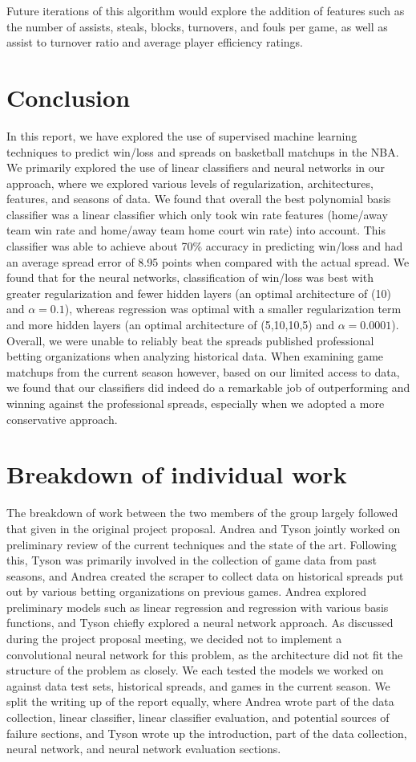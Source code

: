 \documentclass{article}
\begin{document}
Future iterations of this algorithm would explore the addition of features such as the number of assists, steals, blocks, turnovers, and fouls per game, as well as assist to turnover ratio and average player efficiency ratings.

\section{Conclusion}
In this report, we have explored the use of supervised machine learning techniques to predict win/loss and spreads on basketball matchups in the NBA. We primarily explored the use of linear classifiers and neural networks in our approach, where we explored various levels of regularization, architectures, features, and seasons of data. We found that overall the best polynomial basis classifier was a linear classifier which only took win rate features (home/away team win rate and home/away team home court win rate) into account. This classifier was able to achieve about 70\% accuracy in predicting win/loss and had an average spread error of 8.95 points when compared with the actual spread. We found that for the neural networks, classification of win/loss was best with greater regularization and fewer hidden layers (an optimal architecture of (10) and $\alpha = 0.1$), whereas regression was optimal with a smaller regularization term and more hidden layers (an optimal architecture of (5,10,10,5) and $\alpha = 0.0001$). Overall, we were unable to reliably beat the spreads published professional betting organizations when analyzing historical data. When examining game matchups from the current season however, based on our limited access to data, we found that our classifiers did indeed do a remarkable job of outperforming and winning against the professional spreads, especially when we adopted a more conservative approach.

\section{Breakdown of individual work}
The breakdown of work between the two members of the group largely followed that given in the original project proposal. Andrea and Tyson jointly worked on preliminary review of the current techniques and the state of the art. Following this, Tyson was primarily involved in the collection of game data from past seasons, and Andrea created the scraper to collect data on historical spreads put out by various betting organizations on previous games. Andrea explored preliminary models such as linear regression and regression with various basis functions, and Tyson chiefly explored a neural network approach. As discussed during the project proposal meeting, we decided not to implement a convolutional neural network for this problem, as the architecture did not fit the structure of the problem as closely. We each tested the models we worked on against data test sets, historical spreads, and games in the current season. We split the writing up of the report equally, where Andrea wrote part of the data collection, linear classifier, linear classifier evaluation, and potential sources of failure sections, and Tyson wrote up the introduction, part of the data collection, neural network, and neural network evaluation sections.
\end{document}

